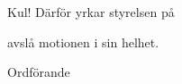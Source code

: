 \documentclass[../_main/handlingar.tex]{subfiles}
\begin{document}
\motionssvar

Kul! Därför yrkar styrelsen på
\begin{attsatser}
    \att avslå motionen i sin helhet.
\end{attsatser}

\begin{signatures}{1}
    \ist
    \signature{Erik Månsson}{Ordförande}
\end{signatures}
\end{document}
